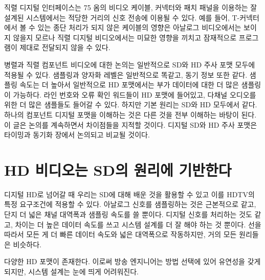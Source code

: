 직렬 디지털 인터페이스는 75 옴의 비디오 케이블, 커넥터와 패치 패널을 이용하는 잘 설계된 시스템에서는 적당한 거리의 신호 전송에 이용될 수 있다. 예를 들어, T-커넥터에서 볼 수 있는 종단 처리가 되지 않은 케이블의 영향은 아날로그 비디오에서는 보이지 않을지 모르나 직렬 디지털 비디오에서는 미묘한 영향을 끼치고 잠재적으로 프로그램이 제대로 전달되지 않을 수 있다.


병렬과 직렬 컴포넌트 비디오에 대한 논의는 일반적으로 SD와 HD 주사 포맷 모두에 적용될 수 있다. 샘플링과 양자화 레벨은 일반적으로 똑같고, 동기 정보 또한 같다. 샘플링 속도는 더 높아서 일반적으로 HD 포맷에서는 부가 데이터에 대한 더 많은 샘플링이 가능하다.
라인 번호와 오류 확인 워드들이 HD 포맷에 들어있고, 다채널 오디오를 위한 더 많은 샘플들도 들어갈 수 있다. 하지만 기본 원리는 SD와 HD 모두에서 같다. 하나의 컴포넌트 디지털 포맷을 이해하는 것은 다른 것을 전부 이해하는 바탕이 된다.
이 글은 논의를 계속하면서 차이점들을 지적할 것이다. 디지털 SD와 HD 주사 포맷은 타이밍과 동기화 장에서 논의되고 비교될 것이다.

\section{HD 비디오는 SD의 원리에 기반한다}
디지털 HD로 넘어갈 때 우리는 SD에 대해 배운 것을 활용할 수 있고 이를 HDTV의 특정 요구조건에 적용할 수 있다. 아날로그 신호를 샘플링하는 것은 근본적으로 같고, 단지 더 넓은 채널 대역폭과 샘플링 속도를 쓸 뿐이다.
디지털 신호를 처리하는 것도 같고, 차이는 더 높은 데이터 속도를 쓰고 시스템 설계를 더 잘 해야 하는 것 뿐이다. 선을 따라서 모든 게 더 빠른 데이터 속도와 넓은 대역폭으로 작동하지만, 거의 모든 원리들은 비슷하다.


다양한 HD 포맷이 존재한다. 이로써 방송 엔지니어는 방법 선택에 있어 유연성을 갖게 되지만, 시스템 설계는 눈에 띄게 어려워진다.


